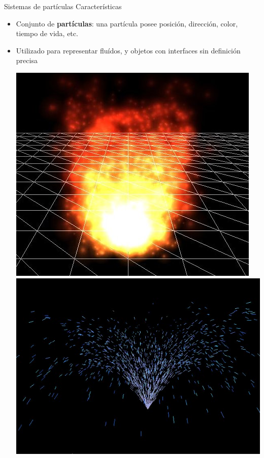 \documentclass[spanish]{beamer}
\begin{document}
\begin{frame}{Sistemas de partículas}
Características
\begin{itemize}
\item Conjunto de \textbf{partículas}: una partícula posee posición, dirección, color, tiempo de vida, etc.
\item Utilizado para representar fluídos, y objetos con interfaces sin definición precisa

\includegraphics[scale = 0.3]{../figures/fire}
\includegraphics[scale = 0.277]{../figures/fireworks}
\end{itemize}
\end{frame}
\end{document}
